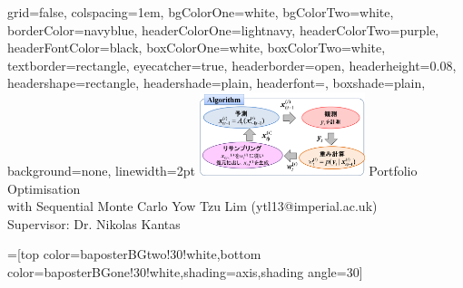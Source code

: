 \documentclass[portrait,final,a0paper]{baposter}
\begin{document}
\newlength{\leftimgwidth}
\begin{poster}%
  {
  grid=false,
  colspacing=1em,
  bgColorOne=white,
  bgColorTwo=white,
  borderColor=navyblue,
  headerColorOne=lightnavy,
  headerColorTwo=purple,
  headerFontColor=black,
  boxColorOne=white,
  boxColorTwo=white,
  textborder=rectangle,
  eyecatcher=true,
  headerborder=open,
  headerheight=0.08\textheight,
  headershape=rectangle,
  headershade=plain,
  headerfont=\Large\textsf, %
  boxshade=plain,
  background=none,
  linewidth=2pt
  }
  {\includegraphics[width=13em]{pf}} %
  {\sf %
  Portfolio Optimisation\\with Sequential Monte Carlo}
  {\sf %
   Yow Tzu Lim (ytl13@imperial.ac.uk) \\ Supervisor: Dr. Nikolas Kantas
  }
  {%
  }

  =[top color=baposterBGtwo!30!white,bottom color=baposterBGone!30!white,shading=axis,shading angle=30]

     \setlength{\leftimgwidth}{0.78em+8.0em}


\end{poster}
\end{document}
